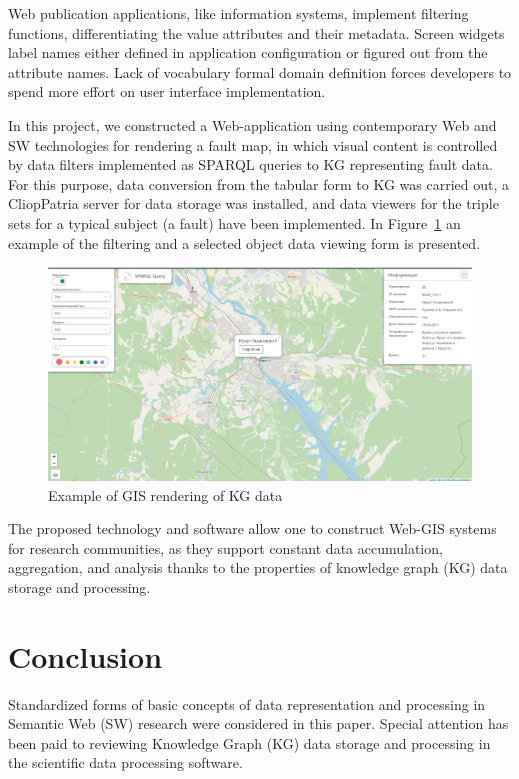 \documentclass[
]{ceurart}
\begin{document}
Web publication applications, like information systems, implement filtering functions, differentiating the value attributes and their metadata.  Screen widgets label names either defined in application configuration or figured out from the attribute names.  Lack of vocabulary formal domain definition forces developers to spend more effort on user interface implementation.

In this project, we constructed a Web-application using contemporary Web and SW technologies for rendering a fault map, in which visual content is controlled by data filters implemented as SPARQL queries to KG representing fault data.  For this purpose, data conversion from the tabular form to KG was carried out, a CliopPatria server for data storage was installed, and data viewers for the triple sets for a typical subject (a fault) have been implemented.  In Figure~\ref{fig:gis-ex} an example of the filtering and a selected object data viewing form is presented.
\begin{figure}
  \centering
  \includegraphics[width=\linewidth]{faults-leaflet-doc.png}
  \caption{Example of GIS rendering of KG data}
  \label{fig:gis-ex}
\end{figure}

The proposed technology and software allow one to construct Web-GIS systems for research communities, as they support constant data accumulation, aggregation, and analysis thanks to the properties of knowledge graph (KG) data storage and processing.

\section*{Conclusion}
\label{sec:disc}

Standardized forms of basic concepts of data representation and processing in Semantic Web (SW) research were considered in this paper.  Special attention has been paid to reviewing Knowledge Graph (KG) data storage and processing in the scientific data processing software.
\end{document}
